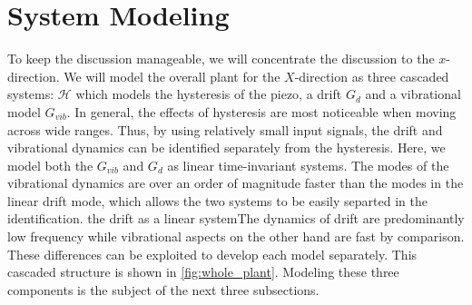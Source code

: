 \documentclass[journal,twocolumn,twoside]{IEEEtran}
\begin{document}
\section{System Modeling}
To keep the discussion manageable, we will concentrate the discussion to the $x$-direction. We will model the overall plant for the $X$-direction as three cascaded systems: $\mathcal{H}$ which models the hysteresis of the piezo, a drift  $G_d$ and a vibrational model $G_{vib}$. In general, the effects of hysteresis are most noticeable when moving across wide ranges. Thus, by using relatively small input signals, the drift and vibrational dynamics can be identified separately from the hysteresis. Here, we model both the $G_{vib}$ and $G_d$ as linear time-invariant systems. The modes of the vibrational dynamics are over an order of magnitude faster than the modes in the linear drift mode, which allows the two systems to be easily separted in the identification.  the drift as a linear systemThe dynamics of drift are predominantly low frequency while vibrational aspects on the other hand are fast by comparison. These differences can be exploited to develop each model separately. This cascaded structure is shown in \ref{fig:whole_plant}. Modeling these three components is the subject of the next three subsections.




%   
%   
\end{document}
